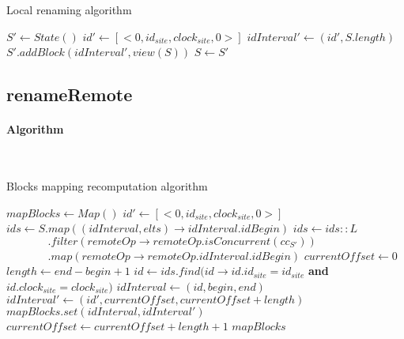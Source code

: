 \documentclass[a4paper]{article}
\begin{document}
\begin{algorithm}
  \caption{Local renaming algorithm}
  \label{alg:rename-local-block}
  \begin{algorithmic}
      \State $S' \gets State()$
      \State $id' \gets [<0, id_{site}, clock_{site}, 0>]$
      \State $idInterval' \gets (id', S.length)$
      \State $S'.addBlock(idInterval', view(S))$
      \State $S \gets S'$
    \EndProcedure
  \end{algorithmic}
\end{algorithm}

\subsection{renameRemote}

\paragraph{Algorithm}~\\

\begin{algorithm}
  \caption{Blocks mapping recomputation algorithm}
  \label{alg:blocks-mapping-recomputation}
  \begin{algorithmic}
      \State $mapBlocks \gets Map()$
      \State $id' \gets [<0, id_{site}, clock_{site}, 0>]$
      \State $ids \gets S.map((idInterval, elts) \to idInterval.idBegin)$
      \State $ids \gets ids :: L$
      \State $~~~~~~~~~~~~~~~~~.filter(remoteOp \to remoteOp.isConcurrent(cc_{S'}))$
      \State $~~~~~~~~~~~~~~~~~.map(remoteOp \to remoteOp.idInterval.idBegin)$
      \State $currentOffset \gets 0$
        \State $length \gets end - begin + 1$
        \State $id \gets ids.find(id \to id.id_{site} = id_{site}$ \textbf{and} $id.clock_{site} = clock_{site})$
        \State $idInterval \gets (id, begin, end)$
        \State $idInterval' \gets (id', currentOffset, currentOffset + length)$
        \State $mapBlocks.set(idInterval, idInterval')$
        \State $currentOffset \gets currentOffset + length + 1$
      \EndFor
      \State \Return $mapBlocks$
    \EndFunction
  \end{algorithmic}
\end{algorithm}
\end{document}
